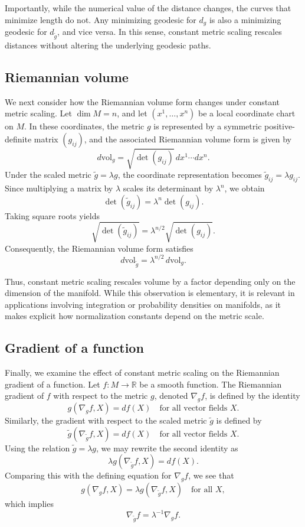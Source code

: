 \documentclass[11pt]{article}
\begin{document}
Importantly, while the numerical value of the distance changes, the curves that
minimize length do not. Any minimizing geodesic for $d_g$ is also a minimizing
geodesic for $d_{\tilde g}$, and vice versa. In this sense, constant metric
scaling rescales distances without altering the underlying geodesic paths.

\subsection{Riemannian volume}

We next consider how the Riemannian volume form changes under constant metric
scaling. Let $\dim M = n$, and let $(x^1,\dots,x^n)$ be a local coordinate chart
on $M$. In these coordinates, the metric $g$ is represented by a symmetric
positive-definite matrix $(g_{ij})$, and the associated Riemannian volume form is
given by
\[
d\mathrm{vol}_g
= \sqrt{\det(g_{ij})}\, dx^1 \cdots dx^n.
\]
Under the scaled metric $\tilde g = \lambda g$, the coordinate representation
becomes $\tilde g_{ij} = \lambda g_{ij}$. Since multiplying a matrix by
$\lambda$ scales its determinant by $\lambda^n$, we obtain
\[
\det(\tilde g_{ij})
= \lambda^n \det(g_{ij}).
\]
Taking square roots yields
\[
\sqrt{\det(\tilde g_{ij})}
= \lambda^{n/2} \sqrt{\det(g_{ij})}.
\]
Consequently, the Riemannian volume form satisfies
\[
d\mathrm{vol}_{\tilde g}
= \lambda^{n/2}\, d\mathrm{vol}_g.
\]

Thus, constant metric scaling rescales volume by a factor depending only on the
dimension of the manifold. While this observation is elementary, it is relevant
in applications involving integration or probability densities on manifolds, as
it makes explicit how normalization constants depend on the metric scale.

\subsection{Gradient of a function}

Finally, we examine the effect of constant metric scaling on the Riemannian
gradient of a function. Let $f : M \to \mathbb{R}$ be a smooth function. The
Riemannian gradient of $f$ with respect to the metric $g$, denoted $\nabla_g f$,
is defined by the identity
\[
g(\nabla_g f, X) = df(X)
\quad \text{for all vector fields } X.
\]
Similarly, the gradient with respect to the scaled metric $\tilde g$ is defined
by
\[
\tilde g(\nabla_{\tilde g} f, X) = df(X)
\quad \text{for all vector fields } X.
\]
Using the relation $\tilde g = \lambda g$, we may rewrite the second identity as
\[
\lambda g(\nabla_{\tilde g} f, X) = df(X).
\]
Comparing this with the defining equation for $\nabla_g f$, we see that
\[
g(\nabla_g f, X) = \lambda g(\nabla_{\tilde g} f, X)
\quad \text{for all } X,
\]
which implies
\[
\nabla_{\tilde g} f = \lambda^{-1} \nabla_g f.
\]
\end{document}
